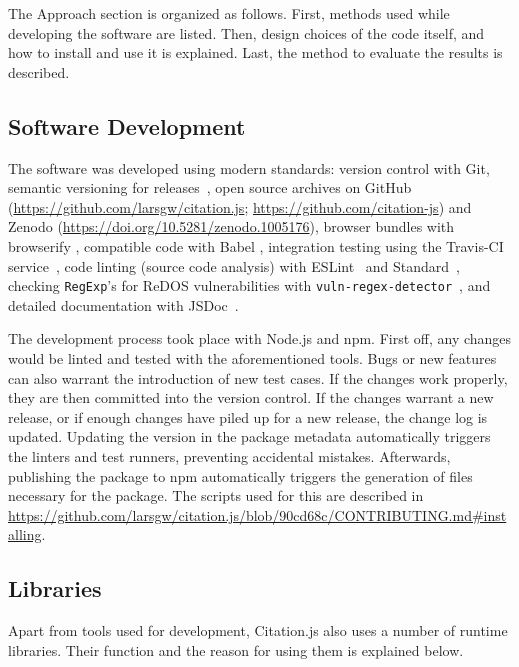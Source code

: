 \documentclass[fleqn,10pt,lineno]{wlpeerj} %
\begin{document}
The Approach section is organized as follows. First, methods used while developing the software are listed. Then, design choices of the code itself, and how to install and use it is explained. Last, the method to evaluate the results is described.

\subsection*{Software Development}

The software was developed using modern standards: version control with Git, semantic versioning for releases~\citep{preston-werner_semantic_2013}, open source archives on GitHub (\url{https://github.com/larsgw/citation.js}; \url{https://github.com/citation-js}) and Zenodo (\url{https://doi.org/10.5281/zenodo.1005176}), browser bundles with browserify \citep{Halliday2018browserify/browserify}, compatible code with Babel \citep{Zhu2018babel/babel}, integration testing using the Travis-CI service~\citep{noauthor_travis_2018}, code linting (source code analysis) with ESLint~\citep{Zakas2018eslint/eslint} and Standard~\citep{Aboukhadijeh2018standard/standard}, checking \texttt{RegExp}'s for ReDOS vulnerabilities with \texttt{vuln-regex-detector}~\citep{davis_impact_2018}, and detailed documentation with JSDoc~\citep{Williams2018jsdoc3/jsdoc}.

The development process took place with Node.js and npm. First off, any changes would be linted and tested with the aforementioned tools. Bugs or new features can also warrant the introduction of new test cases. If the changes work properly, they are then committed into the version control. If the changes warrant a new release, or if enough changes have piled up for a new release, the change log is updated. Updating the version in the package metadata automatically triggers the linters and test runners, preventing accidental mistakes. Afterwards, publishing the package to npm automatically triggers the generation of files necessary for the package. The scripts used for this are described in \url{https://github.com/larsgw/citation.js/blob/90cd68c/CONTRIBUTING.md#installing}.

\subsection*{Libraries}

Apart from tools used for development, Citation.js also uses a number of runtime libraries. Their function and the reason for using them is explained below.
\end{document}
